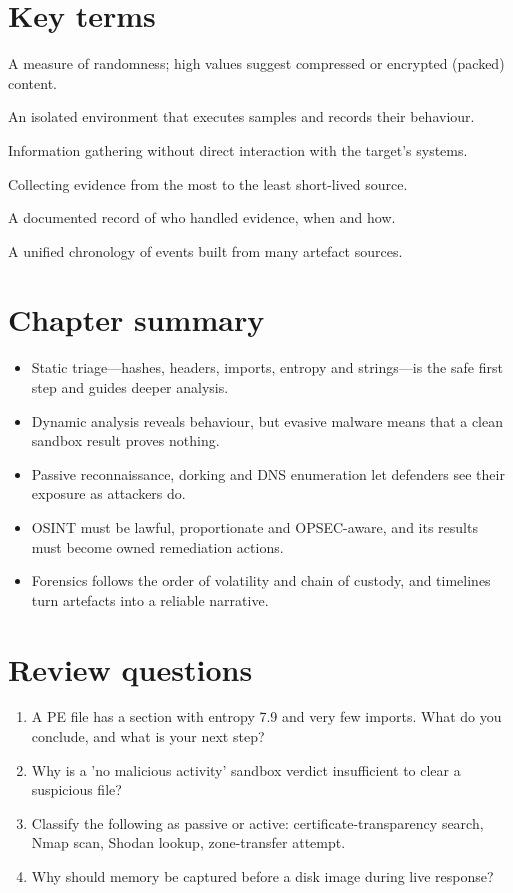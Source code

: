 \documentclass[11pt,openany]{book}
\begin{document}
\section*{Key terms}
\begin{description}[style=nextline,leftmargin=1.2em]
  \item[Entropy] A measure of randomness; high values suggest compressed or encrypted (packed) content.
  \item[Sandbox] An isolated environment that executes samples and records their behaviour.
  \item[Passive reconnaissance] Information gathering without direct interaction with the target's systems.
  \item[Order of volatility] Collecting evidence from the most to the least short-lived source.
  \item[Chain of custody] A documented record of who handled evidence, when and how.
  \item[Super-timeline] A unified chronology of events built from many artefact sources.
\end{description}

\section*{Chapter summary}
\begin{itemize}
  \item Static triage—hashes, headers, imports, entropy and strings—is the safe first step and guides deeper analysis.
  \item Dynamic analysis reveals behaviour, but evasive malware means that a clean sandbox result proves nothing.
  \item Passive reconnaissance, dorking and DNS enumeration let defenders see their exposure as attackers do.
  \item OSINT must be lawful, proportionate and OPSEC-aware, and its results must become owned remediation actions.
  \item Forensics follows the order of volatility and chain of custody, and timelines turn artefacts into a reliable narrative.
\end{itemize}

\section*{Review questions}
\begin{enumerate}
  \item A PE file has a section with entropy 7.9 and very few imports. What do you conclude, and what is your next step?
  \item Why is a 'no malicious activity' sandbox verdict insufficient to clear a suspicious file?
  \item Classify the following as passive or active: certificate-transparency search, Nmap scan, Shodan lookup, zone-transfer attempt.
  \item Why should memory be captured before a disk image during live response?
\end{enumerate}
\end{document}
